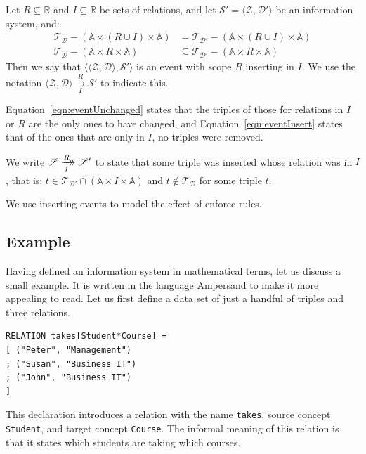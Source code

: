 \documentclass[runningheads]{llncs}
\newcommand{\xrightarrowdbl}[2][]{%
  \xrightarrow[#1]{#2}\mathrel{\mkern-14mu}\rightarrow
}
\newcommand{\pair}[2]{\langle{#1},{#2}\rangle}
\newcommand{\Atoms}{\mathbb{A}}
\newcommand{\Rels}{\mathbb{R}}   %
\newcommand{\triples}{\mathcal{T}}
\newcommand{\Triple}[3]{#1\times#2\times#3}
\newcommand{\dataset}{\mathscr{D}}
\newcommand{\schema}{\mathscr{Z}}
\newcommand{\infsys}{\mathscr{S}}
\begin{document}
   \begin{definition}[Event]
   Let $R \subseteq \Rels$ and $I \subseteq \Rels$ be sets of relations, and let $\infsys' = \pair{\schema}{\dataset'}$ be an information system, and:
      \begin{align}
      \triples_{\dataset} - (\Triple{\Atoms}{(R \cup I)}{\Atoms}) &= \triples_{\dataset'} - (\Triple{\Atoms}{(R \cup I)}{\Atoms})
   \label{eqn:eventUnchanged}\\
      \triples_{\dataset} - (\Triple{\Atoms}{R}{\Atoms}) &\subseteq \triples_{\dataset'} - (\Triple{\Atoms}{R}{\Atoms})
   \label{eqn:eventInsert}
   \end{align}
   Then we say that $\pair{\pair{\schema}{\dataset}}{\infsys'}$ is an event with scope $R$ inserting in $I$.
   We use the notation $\pair{\schema}{\dataset} \xrightarrow[I]{R} \infsys'$ to indicate this.
   \end{definition}
   
   Equation~\ref{eqn:eventUnchanged} states that the triples of those for relations in $I$ or $R$ are the only ones to have changed, and Equation~\ref{eqn:eventInsert} states that of the ones that are only in $I$, no triples were removed.
   
   \begin{definition}
   We write $\infsys \xrightarrowdbl[I]{R} \infsys'$ to state that some triple was inserted whose relation was in $I$, that is:
   $t \in \triples_{\dataset'} \cap (\Triple{\Atoms}{I}{\Atoms})$ and $t \not\in \triples_{\dataset}$ for some triple $t$.
   \end{definition}
   
   We use inserting events to model the effect of enforce rules.

\subsection{Example}
\label{sct:Example existing IS}
   Having defined an information system in mathematical terms, let us discuss a small example.
   It is written in the language Ampersand to make it more appealing to read.
   Let us first define a data set of just a handful of triples and three relations.
\begin{verbatim}
RELATION takes[Student*Course] =
[ ("Peter", "Management")
; ("Susan", "Business IT")
; ("John", "Business IT")
]
\end{verbatim}
   This declaration introduces a relation with the name \verb#takes#,
   source concept \verb#Student#, and
   target concept \verb#Course#.
   The informal meaning of this relation is that it states which students are taking which courses.
\end{document}
